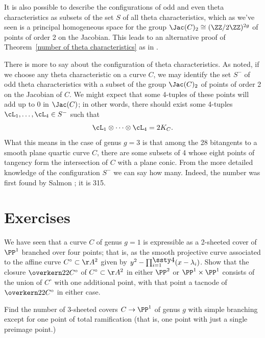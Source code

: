  It is also
 possible to describe the configurations of odd and even theta
characteristics as subsets of the set $S$ of all theta characteristics,
which as we've seen is a principal
homogeneous space for the group
$\Jac(C)_2 \cong (\ZZ/2\ZZ)^{2g}$ of
points of order 2 on the Jacobian.
%
 This leads to an alternative proof of
Theorem~\ref{number of theta characteristics} as in \cite{JHPaper}.

\begin{fact}
There is more to say about the configuration of theta characteristics.
As noted, if we choose any theta characteristic on a curve $C$, we may
 identify the set $S^-$ of odd theta characteristics with a subset of the
 group $\Jac(C)_2$ of points of order 2 on the Jacobian of $C$. We might
 expect that some 4-tuples of these points will add up to 0 in $\Jac(C)$;
 in other words, there should exist some 4-tuples $\cL_1,\dots,\cL_4
 \in S^-$ such that
$$
\cL_1\otimes \dots \otimes\cL_4 = 2K_C.
$$
What this means in the case of genus $g=3$ is that among the 28 bitangents
%
to a smooth plane quartic curve $C$, there are some subsets of 4 whose
eight points of tangency form the intersection of $C$ with a plane
conic. From the more detailed knowledge of the configuration $S^-$
we can say how many. Indeed, the number was first found by Salmon
%
\citeyear{MR0115124};
it is 315.
\end{fact}

\section{Exercises}
 \begin{exercise}
  We have seen that a curve $C$ of genus $g=1$ is expressible as a
  2-sheeted cover of $\PP^1$ branched over four points; that is, as
  the smooth projective curve associated to the affine curve $C^\circ
  \subset \AA^2$ given by $y^2 -
\smash{\prod_{i=1}^{\smash{\lower1.5pt\hbox{$\ssty4$}}} (x-\lambda_i)}$.
  Show that
  the closure $\overkern22{C^\circ}$ of $C^\circ \subset \AA^2$ in either
  $\PP^2$ or $\PP^1 \times \PP^1$ consists of the union of $C^\circ$ with
  one additional point, with that point a tacnode of $\overkern22{C^\circ}$
  in either case.
  \end{exercise}

\begin{exercise}
Find the number of
3-sheeted covers
%
$C \to \PP^1$ of genus $g$ with
simple branching except for one point of
%
%
total ramification
%
(that is,
one point with just a single preimage point.)
\end{exercise}

